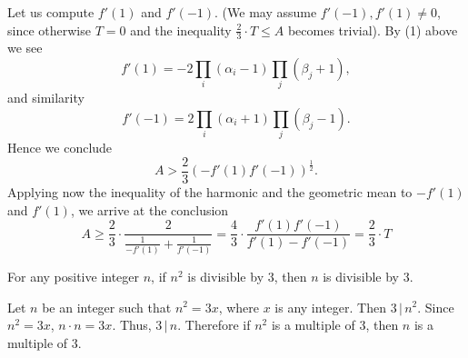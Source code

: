 \documentclass[12pt]{article}
\theoremstyle{definition}
\begin{document}
Let us compute $f'(1)$ and $f'(-1)$. (We may assume $f'(-1),f'(1)\ne0$, since otherwise $T=0$ and the inequality $\frac{2}{3}\cdot T\le A$ becomes trivial). By (1) above we see
$$
f'(1)=-2\prod_i(\alpha_i-1)\prod_j(\beta_j+1),
$$
and similarity
$$
f'(-1)=2\prod_i(\alpha_i+1)\prod_j(\beta_j-1).
$$
Hence we conclude 
$$
A > \frac{2}{3}\left(-f'(1)f'(-1)\right)^\frac{1}{2}.
$$
Applying now the inequality of the harmonic and the geometric mean to $-f'(1)$ and $f'(1)$, we arrive at the conclusion
$$
A\ge\frac{2}{3}\cdot\frac{2}{\frac{1}{-f'(1)}+\frac{1}{f'(-1)}}=\frac{4}{3}\cdot\frac{f'(1)f'(-1)}{f'(1)-f'(-1)}=\frac{2}{3}\cdot T
$$


\newpage

For any positive integer $n$, if $n^2$ is divisible by 3, then $n$ is divisible by 3.

\newpage

Let $n$ be an integer such that $n^2=3x$, where $x$ is any integer. Then $3\, |\, n^2$. 
Since $n^2=3x$, $n\cdot n=3x$. Thus, $3\, |\, n$. Therefore if $n^2$ is a multiple of 3, then $n$ is a multiple of 3. 




% 
 
\end{document}
